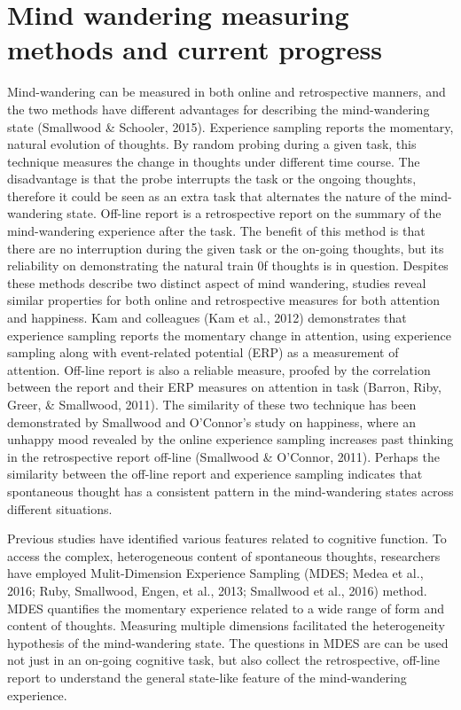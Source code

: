 \section{Mind wandering measuring methods and current progress}
\label{intro:measures}
Mind-wandering can be measured in both online and retrospective manners, and the two methods have different advantages for describing the mind-wandering state (Smallwood \& Schooler, 2015). Experience sampling reports the momentary, natural evolution of thoughts. By random probing during a given task, this technique measures the change in thoughts under different time course. The disadvantage is that the probe interrupts the task or the ongoing thoughts, therefore it could be seen as an extra task that alternates the nature of the mind-wandering state. Off-line report is a retrospective report on the summary of the mind-wandering experience after the task. The benefit of this method is that there are no interruption during the given task or the on-going thoughts, but its reliability on demonstrating the natural train 0f thoughts is in question.  Despites these methods describe two distinct aspect of mind wandering, studies reveal similar properties for both online and retrospective measures for both attention and happiness. Kam and colleagues (Kam et al., 2012) demonstrates that experience sampling reports the momentary change in attention, using experience sampling along with event-related potential (ERP) as a measurement of attention. Off-line report is also a reliable measure, proofed by the correlation between the report and their ERP measures on attention in task (Barron, Riby, Greer, \& Smallwood, 2011). The similarity of these two technique has been demonstrated by Smallwood and O'Connor’s study on happiness, where an unhappy mood revealed by the online experience sampling increases past thinking in the retrospective report off-line (Smallwood \& O’Connor, 2011). Perhaps the similarity between the off-line report and experience sampling indicates that spontaneous thought has a consistent pattern in the mind-wandering states across different situations. 

Previous studies have identified various features related to cognitive function. To access the complex, heterogeneous content of spontaneous thoughts, researchers have employed Mulit-Dimension Experience Sampling (MDES; Medea et al., 2016; Ruby, Smallwood, Engen, et al., 2013; Smallwood et al., 2016) method. MDES quantifies the momentary experience related to a wide range of form and content of thoughts. Measuring multiple dimensions facilitated the heterogeneity hypothesis of the mind-wandering state. The questions in MDES are can be used not just in an on-going cognitive task, but also collect the retrospective, off-line report to understand the general state-like feature of the mind-wandering experience. 
